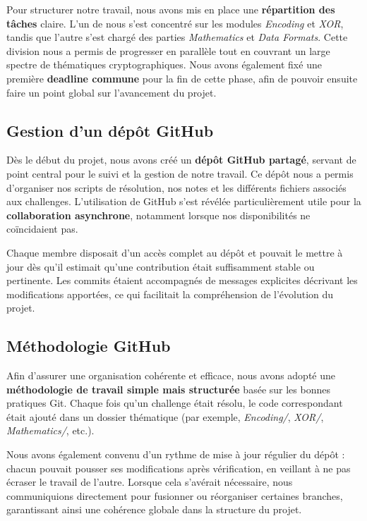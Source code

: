 \documentclass[12pt, a4paper]{article}
\begin{document}
    Pour structurer notre travail, nous avons mis en place une \textbf{répartition des tâches} claire. L’un de nous s’est concentré sur les modules \textit{Encoding} et \textit{XOR}, tandis que l’autre s’est chargé des parties \textit{Mathematics} et \textit{Data Formats}. Cette division nous a permis de progresser en parallèle tout en couvrant un large spectre de thématiques cryptographiques. Nous avons également fixé une première \textbf{deadline commune} pour la fin de cette phase, afin de pouvoir ensuite faire un point global sur l’avancement du projet.
    
    \subsection{Gestion d'un dépôt GitHub}
    Dès le début du projet, nous avons créé un \textbf{dépôt GitHub partagé}, servant de point central pour le suivi et la gestion de notre travail. Ce dépôt nous a permis d’organiser nos scripts de résolution, nos notes et les différents fichiers associés aux challenges. L’utilisation de GitHub s’est révélée particulièrement utile pour la \textbf{collaboration asynchrone}, notamment lorsque nos disponibilités ne coïncidaient pas.

    Chaque membre disposait d’un accès complet au dépôt et pouvait le mettre à jour dès qu’il estimait qu’une contribution était suffisamment stable ou pertinente. Les commits étaient accompagnés de messages explicites décrivant les modifications apportées, ce qui facilitait la compréhension de l’évolution du projet.  
    

    
    \subsection{Méthodologie GitHub}
    Afin d’assurer une organisation cohérente et efficace, nous avons adopté une \textbf{méthodologie de travail simple mais structurée} basée sur les bonnes pratiques Git.  
    Chaque fois qu’un challenge était résolu, le code correspondant était ajouté dans un dossier thématique (par exemple, \textit{Encoding/}, \textit{XOR/}, \textit{Mathematics/}, etc.).

    Nous avons également convenu d’un rythme de mise à jour régulier du dépôt : chacun pouvait pousser ses modifications après vérification, en veillant à ne pas écraser le travail de l’autre. Lorsque cela s’avérait nécessaire, nous communiquions directement pour fusionner ou réorganiser certaines branches, garantissant ainsi une cohérence globale dans la structure du projet.
\end{document}
